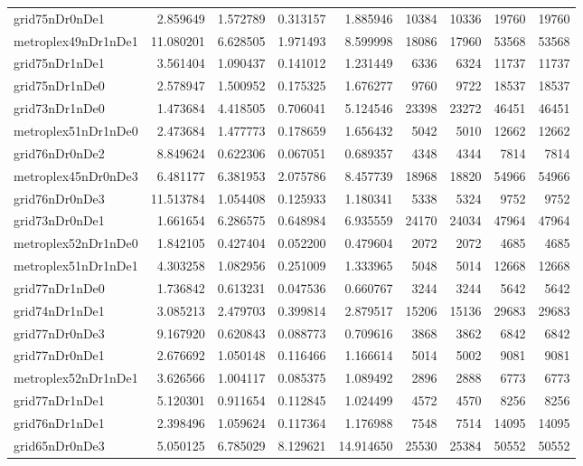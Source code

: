 \begin{longtable}{|l|r|r|r|r|r|r|r|r|}
grid75nDr0nDe1 & 2.859649 & 1.572789 & 0.313157 & 1.885946 & 10384 & 10336 & 19760 & 19760 \\
metroplex49nDr1nDe1 & 11.080201 & 6.628505 & 1.971493 & 8.599998 & 18086 & 17960 & 53568 & 53568 \\
grid75nDr1nDe1 & 3.561404 & 1.090437 & 0.141012 & 1.231449 & 6336 & 6324 & 11737 & 11737 \\
grid75nDr1nDe0 & 2.578947 & 1.500952 & 0.175325 & 1.676277 & 9760 & 9722 & 18537 & 18537 \\
grid73nDr1nDe0 & 1.473684 & 4.418505 & 0.706041 & 5.124546 & 23398 & 23272 & 46451 & 46451 \\
metroplex51nDr1nDe0 & 2.473684 & 1.477773 & 0.178659 & 1.656432 & 5042 & 5010 & 12662 & 12662 \\
grid76nDr0nDe2 & 8.849624 & 0.622306 & 0.067051 & 0.689357 & 4348 & 4344 & 7814 & 7814 \\
metroplex45nDr0nDe3 & 6.481177 & 6.381953 & 2.075786 & 8.457739 & 18968 & 18820 & 54966 & 54966 \\
grid76nDr0nDe3 & 11.513784 & 1.054408 & 0.125933 & 1.180341 & 5338 & 5324 & 9752 & 9752 \\
grid73nDr0nDe1 & 1.661654 & 6.286575 & 0.648984 & 6.935559 & 24170 & 24034 & 47964 & 47964 \\
metroplex52nDr1nDe0 & 1.842105 & 0.427404 & 0.052200 & 0.479604 & 2072 & 2072 & 4685 & 4685 \\
metroplex51nDr1nDe1 & 4.303258 & 1.082956 & 0.251009 & 1.333965 & 5048 & 5014 & 12668 & 12668 \\
grid77nDr1nDe0 & 1.736842 & 0.613231 & 0.047536 & 0.660767 & 3244 & 3244 & 5642 & 5642 \\
grid74nDr1nDe1 & 3.085213 & 2.479703 & 0.399814 & 2.879517 & 15206 & 15136 & 29683 & 29683 \\
grid77nDr0nDe3 & 9.167920 & 0.620843 & 0.088773 & 0.709616 & 3868 & 3862 & 6842 & 6842 \\
grid77nDr0nDe1 & 2.676692 & 1.050148 & 0.116466 & 1.166614 & 5014 & 5002 & 9081 & 9081 \\
metroplex52nDr1nDe1 & 3.626566 & 1.004117 & 0.085375 & 1.089492 & 2896 & 2888 & 6773 & 6773 \\
grid77nDr1nDe1 & 5.120301 & 0.911654 & 0.112845 & 1.024499 & 4572 & 4570 & 8256 & 8256 \\
grid76nDr1nDe1 & 2.398496 & 1.059624 & 0.117364 & 1.176988 & 7548 & 7514 & 14095 & 14095 \\
grid65nDr0nDe3 & 5.050125 & 6.785029 & 8.129621 & 14.914650 & 25530 & 25384 & 50552 & 50552 \\

\end{longtable}
